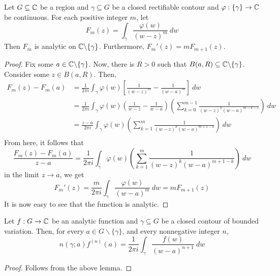 \begin{lemma}
    Let $G\subseteq\mathbb{C}$ be a region and $\gamma\subseteq G$ be a closed rectifiable contour and $\varphi: \{\gamma\}\to\mathbb{C}$ be continuous. For each positive integer $m$, let 
    \begin{equation*}
        F_m(z) = \int_{\gamma}\frac{\varphi(w)}{(w - z)^m}~dw
    \end{equation*}
    Then $F_m$ is analytic on $\mathbb{C}\backslash\{\gamma\}$. Furthermore, $F_m'(z) = mF_{m + 1}(z)$.
\end{lemma}
\begin{proof}
    Fix some $a\in\mathbb{C}\backslash\{\gamma\}$. Now, there is $R > 0$ such that $B(a,R)\subseteq\mathbb{C}\backslash\{\gamma\}$. Consider some $z\in B(a,R)$. Then, 
    \begin{align*}
        F_m(z) - F_m(a) &= \frac{1}{2\pi i}\int_{\gamma}\varphi(w)\left[\frac{1}{(w - z)^{m}} - \frac{1}{(w - a)^m}\right]~dw\\
        &= \frac{1}{2\pi i}\int_\gamma\varphi(w)\left(\frac{1}{w - z} - \frac{1}{w - a}\right)\left(\sum_{k = 0}^{m - 1}\frac{1}{(w - z)^k(w - a)^{m - k - 1}}\right)~dw\\
        &= \frac{z - a}{2\pi i}\int_\gamma\varphi(w)\left(\sum_{k = 1}^{m}\frac{1}{(w - z)^k(w - a)^{m + 1 - k}}\right)~dw\\
    \end{align*}
    From here, it follows that 
    \begin{equation*}
        \frac{F_m(z) - F_m(a)}{z - a} = \frac{1}{2\pi i}\int_\gamma\varphi(w)\left(\sum_{k = 1}^m\frac{1}{(w - z)^k(w - a)^{m + 1 - k}}\right)~dw
    \end{equation*}
    in the limit $z\to a$, we get 
    \begin{equation*}
        F_m'(z) = \frac{m}{2\pi i}\int_\gamma\frac{\varphi(w)}{(w - a)^m}~dw = mF_{m + 1}(z)
    \end{equation*}
    It is now easy to see that the function is analytic.
\end{proof}

\begin{theorem}
    Let $f: G\to\mathbb{C}$ be an analytic function and $\gamma\subseteq G$ be a closed contour of bounded variation. Then, for every $a\in G\backslash\{\gamma\}$, and every nonnegative integer $n$, 
    \begin{equation*}
        n(\gamma; a)f^{(n)}(a) = \frac{1}{2\pi i}\int_\gamma\frac{f(w)}{(w - a)^{n + 1}}~dw
    \end{equation*}
\end{theorem}
\begin{proof}
    Follows from the above lemma.
\end{proof}

